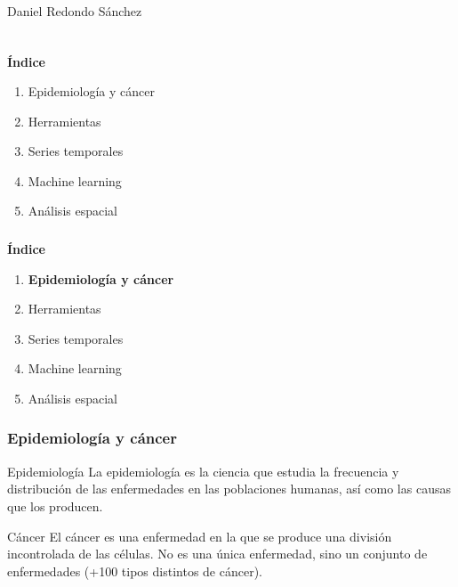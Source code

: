 \documentclass{beamer}
\begin{document}
\begin{frame}
\begin{block}{Daniel Redondo Sánchez}
\begin{columns}
\begin{column}{0.74\textwidth}
			\end{column}
		\end{columns}
	\end{block}
\end{frame}


\begin{frame}\frametitle{}
	\Large{\textbf{Índice}}\\[2ex]
	\normalsize
	\begin{enumerate}
		\item Epidemiología y cáncer\\[2ex]
		\item Herramientas\\[2ex]
		\item Series temporales \\[2ex]
		\item Machine learning  \\[2ex]
		\item Análisis espacial \\[2ex]
	\end{enumerate}
\end{frame}


\begin{frame}\frametitle{}	
	\Large{\textbf{Índice}}\\[2ex]
	\normalsize
	\begin{enumerate}
		\item \textbf{Epidemiología y cáncer}\\[2ex]
		\item Herramientas\\[2ex]
		\item Series temporales \\[2ex]
		\item Machine learning  \\[2ex]
		\item Análisis espacial \\[2ex]
	\end{enumerate}
\end{frame}


\begin{frame}\frametitle{Epidemiología y cáncer}
	\begin{block}{Epidemiología}
		La epidemiología es la ciencia que estudia la frecuencia y distribución de las enfermedades en las poblaciones humanas, así como las causas que los producen.
	\end{block}

	\begin{block}{Cáncer}
		El cáncer es una enfermedad en la que se produce una división incontrolada de las células. No es una única enfermedad, sino un conjunto de enfermedades (+100 tipos distintos de cáncer).
	\end{block}
\end{frame}
\end{document}
